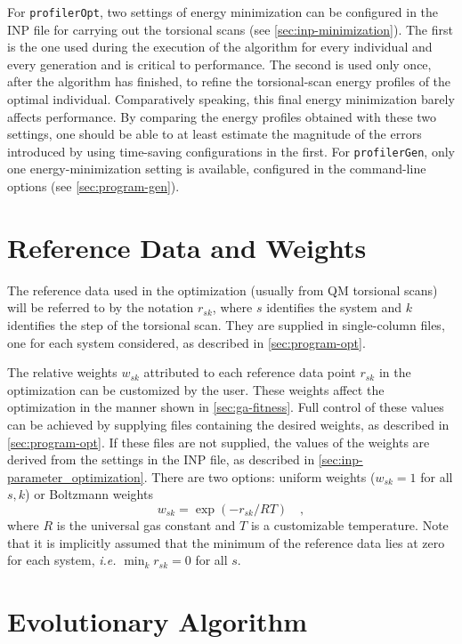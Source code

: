 \documentclass[10pt,a4paper,openany]{memoir}
\numberwithin{equation}{section}
\newcommand{\profileropt}[0]{\texttt{profilerOpt}}
\newcommand{\profilergen}[0]{\texttt{profilerGen}}
\begin{document}
For \profileropt{}, two settings of energy minimization can be
configured in the INP file for carrying out the torsional scans (see
\autoref{sec:inp-minimization}). The first is the one used during the
execution of the algorithm for every individual and every generation
and is critical to performance.  The second is used only once, after
the algorithm has finished, to refine the torsional-scan energy
profiles of the optimal individual. Comparatively speaking, this final
energy minimization barely affects performance. By comparing the
energy profiles obtained with these two settings, one should be able
to at least estimate the magnitude of the errors introduced by using
time-saving configurations in the first. For \profilergen{}, only one
energy-minimization setting is available, configured in the
command-line options (see \autoref{sec:program-gen}).

\section{Reference Data and Weights}
\label{sec:ga-fitness-wei}

The reference data used in the optimization (usually from QM torsional
scans) will be referred to by the notation $r_{sk}$, where $s$
identifies the system and $k$ identifies the step of the torsional
scan.  They are supplied in single-column files, one for each system
considered, as described in \autoref{sec:program-opt}.

The relative weights $w_{sk}$ attributed to each reference data point
$r_{sk}$ in the optimization can be customized by the user.  These
weights affect the optimization in the manner shown in \autoref{sec:ga-fitness}.
Full control of these values can be achieved by
supplying files containing the desired weights, as described in
\autoref{sec:program-opt}. If these files are not supplied, the values
of the weights are derived from the settings in the INP file, as
described in \autoref{sec:inp-parameter_optimization}.  There are two
options: uniform weights ($w_{sk} = 1$ for all $s,k$) or Boltzmann
weights
\begin{equation*}
  w_{sk} = \exp{(-r_{sk}/RT)} \quad , 
\end{equation*}
where $R$ is the universal gas constant and $T$ is a customizable temperature.
Note that it is implicitly assumed that the minimum of the reference data
lies at zero for each system, \textit{i.e.} $\min_k{r_{sk}} = 0$ for all $s$.

\section{Evolutionary Algorithm}
\label{sec:ga}
\end{document}
